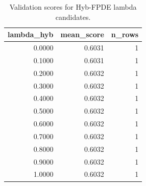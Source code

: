 \begin{table}[t]
\caption{Validation scores for Hyb-FPDE lambda candidates.}
\label{tab:lambda_distribution_computed}
\centering
\begin{tabular}{rrr}
\toprule
lambda\_hyb & mean\_score & n\_rows \\
\midrule
0.0000 & 0.6031 & 1 \\
0.1000 & 0.6031 & 1 \\
0.2000 & 0.6032 & 1 \\
0.3000 & 0.6032 & 1 \\
0.4000 & 0.6032 & 1 \\
0.5000 & 0.6032 & 1 \\
0.6000 & 0.6032 & 1 \\
0.7000 & 0.6032 & 1 \\
0.8000 & 0.6032 & 1 \\
0.9000 & 0.6032 & 1 \\
1.0000 & 0.6032 & 1 \\
\bottomrule
\end{tabular}

\end{table}
